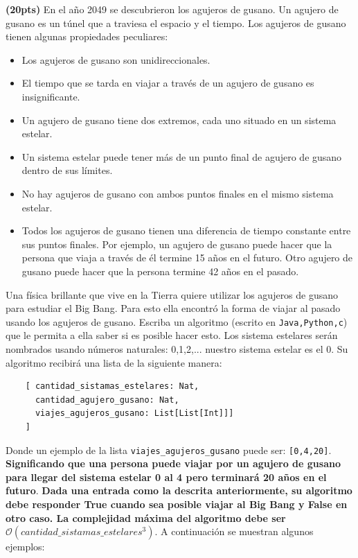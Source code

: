 \documentclass[12pt, a4paper]{exam}
\begin{document}
\begin{questions}
	\pointsdroppedatright
	\question \textbf{(20pts)} En el año 2049 se descubrieron los agujeros de gusano. Un agujero de gusano es un túnel que a traviesa el espacio y el tiempo. Los agujeros de gusano tienen algunas propiedades peculiares:
     \begin{itemize}
         \item Los agujeros de gusano son unidireccionales.
         \item El tiempo que se tarda en viajar a través de un agujero de gusano es insignificante.
         \item Un agujero de gusano tiene dos extremos, cada uno situado en un sistema estelar.
         \item Un sistema estelar puede tener más de un punto final de agujero de gusano dentro de sus límites.
         \item No hay agujeros de gusano con ambos puntos finales en el mismo sistema estelar.
         \item Todos los agujeros de gusano tienen una diferencia de tiempo constante entre sus puntos finales. Por ejemplo, un agujero de gusano puede hacer que la persona que viaja a través de él termine 15 años en el futuro. Otro agujero de gusano puede hacer que la persona termine 42 años en el pasado.
     \end{itemize}
    Una física brillante que vive en la Tierra quiere utilizar los agujeros de gusano para estudiar el Big Bang. Para esto ella encontró la forma de viajar al pasado usando los agujeros de gusano. Escriba un algoritmo (escrito en \verb|Java,Python,c|) que le permita a ella saber si es posible hacer esto. Los sistema estelares serán nombrados usando números naturales: 0,1,2,... nuestro sistema estelar es el 0. Su algoritmo recibirá una lista de la siguiente manera: 
    \begin{verbatim}
    [ cantidad_sistamas_estelares: Nat, 
      cantidad_agujero_gusano: Nat, 
      viajes_agujeros_gusano: List[List[Int]]]
    ]
    \end{verbatim}
    Donde un ejemplo de la lista \verb|viajes_agujeros_gusano| puede ser: \verb|[0,4,20]|. \textbf{Significando que una persona puede viajar por un agujero de gusano para llegar del sistema estelar 0 al 4 pero terminará 20 años en el futuro}. \textbf{Dada una entrada como la descrita anteriormente, su algoritmo debe responder True cuando sea posible viajar al Big Bang y False en otro caso. La complejidad máxima del algoritmo debe ser $\mathcal{O}(cantidad\_sistamas\_estelares^3)$}. A continuación se muestran algunos ejemplos:


\end{questions}
\end{document}
